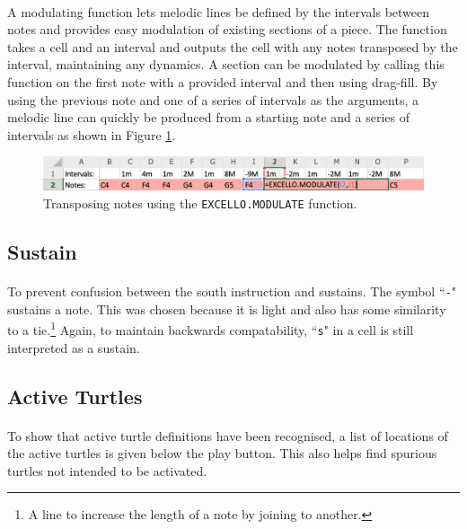 \paragraph{} A modulating function lets melodic lines be defined by the intervals between notes and provides easy modulation of existing sections of a piece. The function takes a cell and an interval and outputs the cell with any notes transposed by the interval, maintaining any dynamics. A section can be modulated by calling this function on the first note with a provided interval and then using drag-fill. By using the previous note and one of a series of intervals as the arguments, a melodic line can quickly be produced from a starting note and a series of intervals as shown in Figure \ref{implementation:modulateFunction}.

\begin{figure}[tbh]
\centerline{\includegraphics[width=150mm]{figs/modulateFunction.png}}
\caption{Transposing notes using the \texttt{EXCELLO.MODULATE} function.}
\label{implementation:modulateFunction}
\end{figure}


\subsection{Sustain}

\paragraph{} To prevent confusion between the south instruction and sustains. The symbol ``\texttt{-}" sustains a note. This was chosen because it is light and also has some similarity to a tie.\footnote{A line to increase the length of a note by joining to another.} Again, to maintain backwards compatability, ``\texttt{s}" in a cell is still interpreted as a sustain.

\subsection{Active Turtles}

\paragraph{} To show that active turtle definitions have been recognised, a list of locations of the active turtles is given below the play button. This also helps find spurious turtles not intended to be activated.


